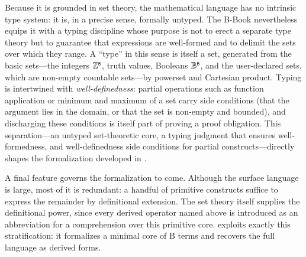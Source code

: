 Because it is grounded in set theory, the mathematical language has no intrinsic
type system: it is, in a precise sense, formally untyped.
The B-Book nevertheless equips it with a typing discipline whose purpose is not
to erect a separate type theory but to guarantee that expressions are
well-formed and to delimit the sets over which they range.
A ``type'' in this sense is itself a set, generated from the basic sets---the
integers \(\mathbb{Z}^{\scriptscriptstyle{\mathsf{B}}}\), truth values, \ie Booleans \(\mathbb{B}^{\scriptscriptstyle{\mathsf{B}}}\), and the user-declared
sets, which are non-empty countable sets---by powerset and Cartesian product.
Typing is intertwined with \emph{well-definedness}: partial operations such as
function application or minimum and maximum of a set carry side conditions
(that the argument lies in the domain, or that the set is non-empty and
bounded), and discharging these conditions is itself part of proving a proof
obligation.
This separation---an untyped set-theoretic core, a typing judgment that ensures
well-formedness, and well-definedness side conditions for partial
constructs---directly shapes the formalization developed in .

A final feature governs the formalization to come.
Although the surface language is large, most of it is redundant: a handful of
primitive constructs suffice to express the remainder by definitional
extension.
The set theory itself supplies the definitional power, since every derived
operator named above is introduced as an abbreviation for a comprehension over
this primitive core.
 exploits exactly this stratification: it formalizes a minimal core
of B terms and recovers the full language as derived forms.
